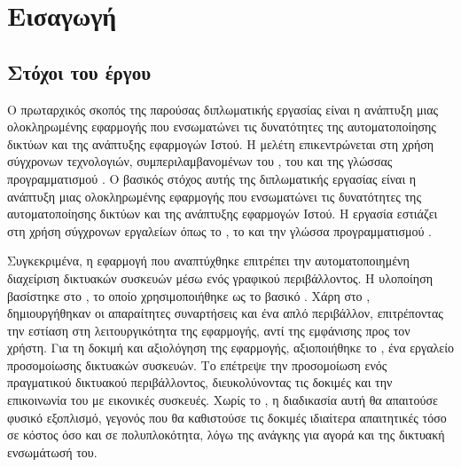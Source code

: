 \chapter{Εισαγωγή}

\section{Στόχοι του έργου}

Ο πρωταρχικός σκοπός της παρούσας διπλωματικής εργασίας είναι η ανάπτυξη μιας ολοκληρωμένης εφαρμογής που ενσωματώνει τις δυνατότητες της αυτοματοποίησης δικτύων 
και της ανάπτυξης εφαρμογών Ιστού. Η μελέτη επικεντρώνεται στη χρήση σύγχρονων τεχνολογιών, συμπεριλαμβανομένων του , του  και της γλώσσας προγραμματισμού .
Ο βασικός στόχος αυτής της διπλωματικής εργασίας είναι η ανάπτυξη μιας ολοκληρωμένης εφαρμογής που ενσωματώνει τις δυνατότητες της αυτοματοποίησης δικτύων και της ανάπτυξης εφαρμογών Ιστού. Η εργασία εστιάζει στη χρήση σύγχρονων εργαλείων όπως το , το  και την γλώσσα προγραμματισμού .   

Συγκεκριμένα, η εφαρμογή που αναπτύχθηκε επιτρέπει την αυτοματοποιημένη διαχείριση δικτυακών συσκευών μέσω ενός γραφικού περιβάλλοντος. Η υλοποίηση βασίστηκε στο , 
το οποίο χρησιμοποιήθηκε ως το βασικό . Χάρη στο , δημιουργήθηκαν οι απαραίτητες συναρτήσεις και ένα απλό  περιβάλλον, επιτρέποντας την εστίαση στη λειτουργικότητα της εφαρμογής, αντί της εμφάνισης προς τον χρήστη.
Για τη δοκιμή και αξιολόγηση της εφαρμογής, αξιοποιήθηκε το , ένα εργαλείο προσομοίωσης δικτυακών συσκευών. Το  επέτρεψε την προσομοίωση ενός πραγματικού δικτυακού περιβάλλοντος, διευκολύνοντας τις δοκιμές και την επικοινωνία του  με εικονικές συσκευές. Χωρίς το , η διαδικασία αυτή θα απαιτούσε φυσικό εξοπλισμό, γεγονός που θα καθιστούσε τις δοκιμές ιδιαίτερα απαιτητικές τόσο σε κόστος όσο και σε πολυπλοκότητα, λόγω της ανάγκης για αγορά και της δικτυακή ενσωμάτωσή του.

